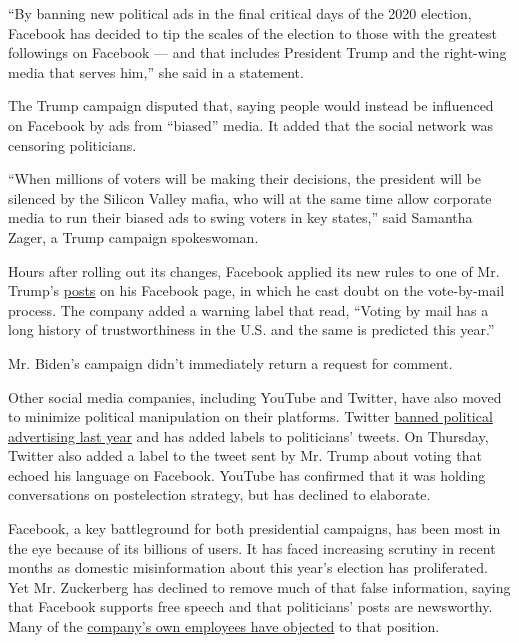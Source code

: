 ``By banning new political ads in the final critical days of the 2020
election, Facebook has decided to tip the scales of the election to
those with the greatest followings on Facebook --- and that includes
President Trump and the right-wing media that serves him,'' she said in
a statement.

The Trump campaign disputed that, saying people would instead be
influenced on Facebook by ads from ``biased'' media. It added that the
social network was censoring politicians.

``When millions of voters will be making their decisions, the president
will be silenced by the Silicon Valley mafia, who will at the same time
allow corporate media to run their biased ads to swing voters in key
states,'' said Samantha Zager, a Trump campaign spokeswoman.

Hours after rolling out its changes, Facebook applied its new rules to
one of Mr. Trump's
\href{https://www.facebookcorewwwi.onion/DonaldTrump/posts/10165384569280725?__xts__\%5B0\%5D=68.ARBXuBeKPLt7PFhVsUpmef8NGDwtIYkEF4DyPrhNbUWSuDR3Bhpwz67vHV0OtoWTKE6l3pCk3cQpOdvPjT-BDXU1HvoTvVIlP5l7S4-7C1Lg57sqxCcthaE2RQBjKPHij04vBj6kmGKP3DKvi-pKE8rJmRxtwJcGN6tVaGRABLUoXus844c-AFuq8XBx7QBEd9MygrrEJ_Gq6Ujkx7UqhgZUyO6nD8ej_3_nqyNAyS5bO81NSIkcAt-AISrH1ru6957VfTBMNk9-9qUQsnLkXFKuuytPv29ozrcbYyc4lyRNTs5G3uUTuLBzNoQR8G-nSOjuAvRZ4LXeKvpv\&__tn__=-R}{posts}
on his Facebook page, in which he cast doubt on the vote-by-mail
process. The company added a warning label that read, ``Voting by mail
has a long history of trustworthiness in the U.S. and the same is
predicted this year.''

Mr. Biden's campaign didn't immediately return a request for comment.

Other social media companies, including YouTube and Twitter, have also
moved to minimize political manipulation on their platforms. Twitter
\href{https://www.nytimes3xbfgragh.onion/2019/10/30/technology/twitter-political-ads-ban.html}{banned
political advertising last year} and has added labels to politicians'
tweets. On Thursday, Twitter also added a label to the tweet sent by Mr.
Trump about voting that echoed his language on Facebook. YouTube has
confirmed that it was holding conversations on postelection strategy,
but has declined to elaborate.

Facebook, a key battleground for both presidential campaigns, has been
most in the eye because of its billions of users. It has faced
increasing scrutiny in recent months as domestic misinformation about
this year's election has proliferated. Yet Mr. Zuckerberg has declined
to remove much of that false information, saying that Facebook supports
free speech and that politicians' posts are newsworthy. Many of the
\href{https://www.nytimes3xbfgragh.onion/2020/06/01/technology/facebook-employee-protest-trump.html}{company's
own employees have objected} to that position.

